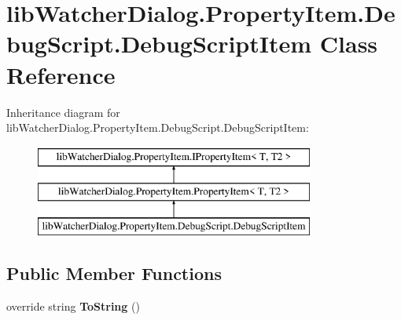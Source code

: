 \hypertarget{classlib_watcher_dialog_1_1_property_item_1_1_debug_script_1_1_debug_script_item}{\section{lib\+Watcher\+Dialog.\+Property\+Item.\+Debug\+Script.\+Debug\+Script\+Item Class Reference}
\label{classlib_watcher_dialog_1_1_property_item_1_1_debug_script_1_1_debug_script_item}
}
Inheritance diagram for lib\+Watcher\+Dialog.\+Property\+Item.\+Debug\+Script.\+Debug\+Script\+Item\+:\begin{figure}[H]
\begin{center}
\leavevmode
\includegraphics[height=3.000000cm]{classlib_watcher_dialog_1_1_property_item_1_1_debug_script_1_1_debug_script_item}
\end{center}
\end{figure}
\subsection*{Public Member Functions}
\begin{DoxyCompactItemize}
\item 
\hypertarget{classlib_watcher_dialog_1_1_property_item_1_1_debug_script_1_1_debug_script_item_a561729bd1090f9e4c741fb621d7081f1}{override string {\bfseries To\+String} ()}\label{classlib_watcher_dialog_1_1_property_item_1_1_debug_script_1_1_debug_script_item_a561729bd1090f9e4c741fb621d7081f1}

\end{DoxyCompactItemize}
